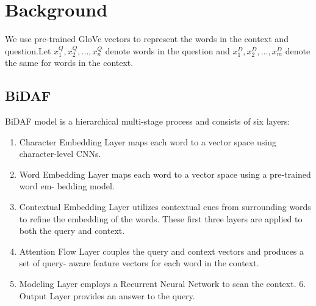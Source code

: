 \documentclass{article} %
\begin{document}
\section{Background}

We use pre-trained GloVe vectors to represent the words in the context and question.Let \( x^{Q}_{1} , x^{Q}_{2} , . . . , x^{Q}_{n} \)  denote words in the question and \(x^{D}_{1} , x^{D}_{2} , . . . , x^{D}_{m} \) denote the same for words in the context.

\subsection{BiDAF}

BiDAF  model is a hierarchical multi-stage process and consists of six layers:
\begin{enumerate}
\item Character Embedding Layer maps each word to a vector space using character-level CNNs.
\item Word Embedding Layer maps each word to a vector space using a pre-trained word em- bedding model.
\item Contextual Embedding Layer utilizes contextual cues from surrounding words to refine the embedding of the words. These first three layers are applied to both the query and context.
\item Attention Flow Layer couples the query and context vectors and produces a set of query- aware feature vectors for each word in the context.
\item Modeling Layer employs a Recurrent Neural Network to scan the context. 6. Output Layer provides an answer to the query.
\end{enumerate}
\end{document}
